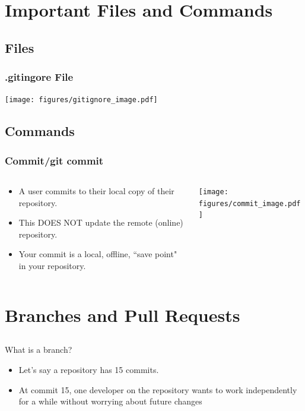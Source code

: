 \documentclass[]{beamer}
\begin{document}
\section{Important Files and Commands}

\subsection{Files}
\begin{frame}[t]\frametitle{.gitingore File}
\centering
\texttt{[image: figures/gitignore\_image.pdf]}
\end{frame}

\subsection{Commands}
\begin{frame}[t]\frametitle{Commit/git commit}
\begin{columns}
\begin{column}{.6\textwidth}
\begin{block}{} 
\begin{itemize}
  \item A user commits to their local copy of their repository. 
  \item This DOES NOT update the remote (online) repository.
  \item Your commit is a local, offline, ``save point" in your repository.
  \end{itemize}
\end{block}
\end{column}

\begin{column}{0.38\textwidth}
\centering
\texttt{[image: figures/commit\_image.pdf]}
\end{column}
\end{columns}

\end{frame}

\section{Branches and Pull Requests}
\subsection{}

\begin{frame}[t]{What is a branch?}
  \begin{block}{}
    \begin{itemize}
      \item Let's say a repository has 15 commits.
      \item At commit 15, one developer on the repository wants to work independently for a while without worrying about future changes
    \end{itemize}
  \end{block}

\end{frame}
\end{document}
